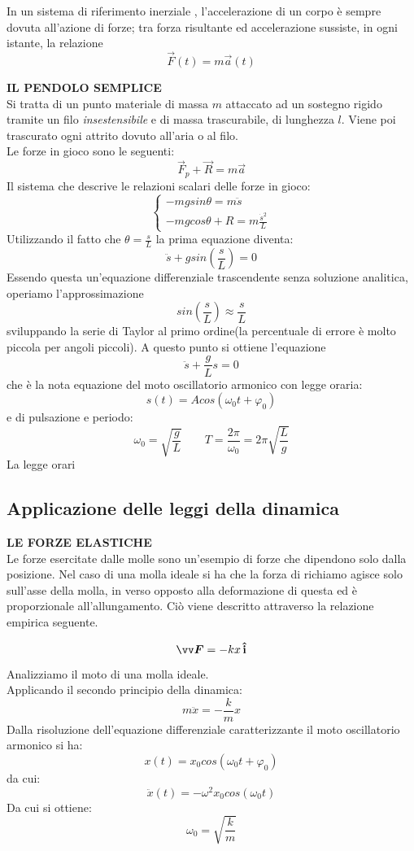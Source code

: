 \begin{legge}
    In un sistema di riferimento inerziale , l'accelerazione di un corpo è sempre dovuta all'azione
    di forze; tra forza risultante ed accelerazione sussiste, in ogni istante, la relazione
    \[
        \vec{F}(t) = m \vec{a}(t)     
    \]

    
\end{legge}


\textbf{IL PENDOLO SEMPLICE} \\
Si tratta di un punto materiale di massa $m$ attaccato ad un sostegno rigido tramite un filo \emph{insestensibile}
e di massa trascurabile, di lunghezza $l$. Viene poi trascurato ogni attrito dovuto all'aria o al filo. \\
Le forze in gioco sono le seguenti:
\[
 \vec{F}_p + \vec{R} = m \vec{a}    
\]
Il sistema che descrive le relazioni scalari delle forze in gioco:
\[
\begin{cases}
    -mg sin\theta = m \ddot{s} \\
    -mg cos \theta + R = m \frac{\dot{s}^2}{L}
\end{cases}    
\]
Utilizzando il fatto che $\theta = \frac{s}{L}$ la prima equazione 
diventa:
\[
\ddot{s} + g sin(\frac{s}{L}) = 0    
\]
Essendo questa un'equazione differenziale trascendente senza soluzione
analitica, operiamo l'approssimazione 
\[
    sin(\frac{s}{L}) \approx \frac{s}{L}
\]
sviluppando la serie di Taylor al primo ordine(la percentuale di errore 
è molto piccola per angoli piccoli). A questo punto si ottiene l'equazione
\[
    \ddot{s} + \frac{g}{L}s = 0
\]
che è la nota equazione del moto oscillatorio armonico con legge oraria:
\[
    s(t) = Acos (\omega_0 t + \varphi_0)
\]
e di pulsazione e periodo:
\[
 \omega_0 = \sqrt{\frac{g}{L}}   \qquad 
 T = \frac{2 \pi}{\omega_0} = 2\pi \sqrt{\frac{L}{g}} 
\]
La legge orari
\subsection*{Applicazione delle leggi della dinamica}
\textbf{LE FORZE ELASTICHE} \\
Le forze esercitate dalle molle sono un'esempio di forze che dipendono solo dalla posizione. Nel caso
di una molla ideale si ha che la forza di richiamo agisce solo sull'asse della molla, in verso
 opposto alla deformazione di questa ed è proporzionale all'allungamento.
Ciò viene descritto attraverso la relazione empirica seguente.
\begin{legge}
    \[
    \vec{F} = -kx \, \v{i}
    \]
\end{legge} 
Analizziamo il moto di una molla ideale. \\
Applicando il secondo principio della dinamica:
\[
  m \ddot{x} = -\frac{k}{m} x    
\]
Dalla risoluzione dell'equazione differenziale caratterizzante il moto oscillatorio armonico si ha:
\[
x(t) = x_0 cos(\omega_0 t + \varphi_0)    
\]
da cui:
\[
 \ddot{x}(t) = - \omega^2 x_0 cos(\omega_0 t)    
\]
Da cui si ottiene:
\[
  \omega_0 = \sqrt{\frac{k}{m}}    
\]
